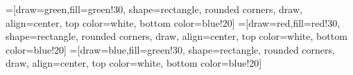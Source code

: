 \documentclass[leqno]{article}           %
\begin{document}
=[draw=green,fill=green!30,
    shape=rectangle,
    rounded corners,
    draw, align=center,
    top color=white,
    bottom color=blue!20]
=[draw=red,fill=red!30,
    shape=rectangle,
    rounded corners,
    draw, align=center,
    top color=white,
    bottom color=blue!20]
=[draw=blue,fill=green!30,
    shape=rectangle,
    rounded corners,
    draw, align=center,
    top color=white,
    bottom color=blue!20]


\newpage

\newpage

\newpage

\newpage

\newpage

\newpage

\newpage

\end{document}
